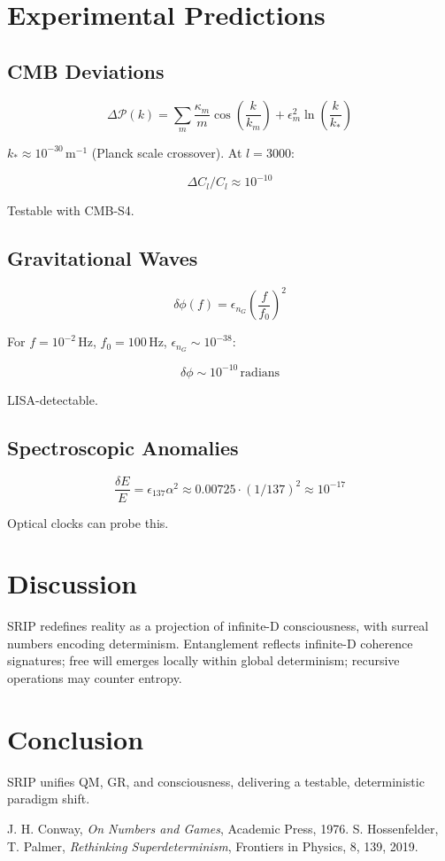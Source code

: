 \documentclass[12pt]{article}
\begin{document}
\section{Experimental Predictions}
\subsection{CMB Deviations}
\[
\Delta \mathcal{P}(k) = \sum_m \frac{\kappa_m}{m} \cos\left(\frac{k}{k_m}\right) + \epsilon_m^2 \ln\left(\frac{k}{k_*}\right)
\]

\(k_* \approx 10^{-30} \, \text{m}^{-1}\) (Planck scale crossover). At \(l = 3000\):

\[
\Delta C_l / C_l \approx 10^{-10}
\]

Testable with CMB-S4.

\subsection{Gravitational Waves}
\[
\delta \phi(f) = \epsilon_{n_G} \left( \frac{f}{f_0} \right)^2
\]

For \(f = 10^{-2} \, \text{Hz}\), \(f_0 = 100 \, \text{Hz}\), \(\epsilon_{n_G} \sim 10^{-38}\):

\[
\delta \phi \sim 10^{-10} \, \text{radians}
\]

LISA-detectable.

\subsection{Spectroscopic Anomalies}
\[
\frac{\delta E}{E} = \epsilon_{137} \alpha^2 \approx 0.00725 \cdot (1/137)^2 \approx 10^{-17}
\]

Optical clocks can probe this.

\section{Discussion}
SRIP redefines reality as a projection of infinite-D consciousness, with surreal numbers encoding determinism. Entanglement reflects infinite-D coherence signatures; free will emerges locally within global determinism; recursive operations may counter entropy.

\section{Conclusion}
SRIP unifies QM, GR, and consciousness, delivering a testable, deterministic paradigm shift.

\begin{thebibliography}{9}
 J. H. Conway, \textit{On Numbers and Games}, Academic Press, 1976.
 S. Hossenfelder, T. Palmer, \textit{Rethinking Superdeterminism}, Frontiers in Physics, 8, 139, 2019.
\end{thebibliography}
\end{document}
